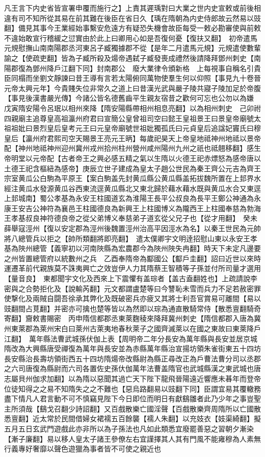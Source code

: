 凡王言下内史省皆宣署申覆而施行之】上責其遲瑀對曰大業之世内史宣敕或前後相違有司不知所從其易在前其難在後臣在省日久【瑀在隋朝為内史侍郎故云然易以豉翻】備見其事今王業經始事繫安危遠方有疑恐失機會故臣每受一敕必勘審使與前敕不違始敢宣行稽緩之愆實由於此上曰卿用心如是吾復何憂【復扶又翻】　初帝遣馬元規慰撫山南南陽郡丞河東呂子臧獨據郡不從【是年二月遣馬元規】元規遣使數輩諭之【使疏吏翻】皆為子臧所殺及煬帝遇弑子臧發喪成禮然後請降拜鄧州刺史【南陽郡復為鄧州降戶江翻下同】封南郡公　廢大業律令頒新格　上每視事自稱名引貴臣同榻而坐劉文靜諫曰昔王導有言若太陽俯同萬物使羣生何以仰照【事見九十卷晉元帝太興元年】今貴賤失位非常久之道上曰昔漢光武與嚴子陵共寢子陵加足於帝腹【事見後漢書嚴光傳】今諸公皆名德舊齒平生親友宿昔之歡何可忘也公勿以為嫌　戊寅隋安陽令呂珉以相州來降【隋安陽縣帶相州相息亮翻】以為相州刺史　己卯祔四親廟主追尊皇高祖瀛州府君曰宣簡公皇曾祖司空曰懿王皇祖景王曰景皇帝廟號太祖祖妣曰景烈皇后皇考元王曰元皇帝廟號世祖妣獨孤氏曰元貞皇后追諡妃竇氏曰穆皇后【瀛州府君熙司空天賜景王亮元王昞】每歲祀昊天上帝皇地祗神州地祗以景帝配【神州地祗神州迎州冀州戎州拾州柱州營州咸州陽州九州之祇也祗翹移翻】感生帝明堂以元帝配【古者帝王之興必感五精之氣以生隋以火德王祀赤熛怒為感帝唐以土德王祀含樞紐為感帝】庚辰立世子建成為皇太子趙公世民為秦王齊公元吉為齊王宗室黄瓜公白駒為平原王【案白駒盖先封黄瓜縣公黄瓜縣盖拓拔魏所置在上邽界水經注黄瓜水發源黄瓜谷西東流逕黄瓜縣北又東北歸於藉水藉水既與黄瓜水合又東逕上邽城南】蜀公孝基為永安王柱國道玄為淮陽王長平公叔良為長平王鄭公神通為永康王安吉公神符為襄邑王柱國德良為新興王上柱國博义為隴西王上柱國奉慈為勃海王孝基叔良神符德良帝之從父弟博义奉慈弟子道玄從父兄子也【從才用翻】　癸未薛舉寇涇州【復以安定郡為涇州後魏置涇州治高平因涇水為名】以秦王世民為元帥將八總管兵以拒之【帥所類翻將即亮翻】　遣太僕卿宇文明逹招慰山東以永安王孝基為陜州總管【義寧初以河南陜縣為宏農郡今為陜州陜失冉翻】時天下未定凡邊要之州皆置總管府以統數州之兵　乙酉奉隋帝為酅國公【酅戶圭翻】詔曰近世以來時運遷革前代親族莫不誅夷興亡之效豈伊人力其隋蔡王智積等子孫並付所司量才選用【量音良】　東都聞宇文化及西來上下震懼有盖琮者【盖古盍翻姓也】上疏請說李密與之合勢拒化及【說輸芮翻】元文都謂盧楚等曰今讐恥未雪而兵力不足若赦密罪使撃化及兩賊自闘吾徐承其弊化及既破密兵亦疲又其將士利吾官賞易可離間【易以豉翻間占莧翻】并密亦可擒也楚等皆以為然即以琮為通直散騎常侍【散悉亶翻騎奇寄翻】齎敕書賜密　丙申隋信都郡丞東萊麴稜來降拜冀州刺史【隋信都郡入唐為冀州東萊郡為萊州宋白曰萊州古萊夷地春秋萊子之國齊滅萊以在國之東故曰東萊降戶江翻】　萬年縣法曹武城孫伏伽上表【周明帝二年分長安為萬年縣與長安並居京城隋改為大興縣唐受禪復為萬年與長安並為赤縣萬年縣治宣揚坊領朱雀街東五十四坊長安縣治長壽坊領街西五十四坊隋煬帝改縣尉為縣正尋改正為戶曹法曹分司以丞郡之六司唐復為縣尉而六司各置佐史孫㐲伽萬年法曹盖隋官也武城縣漢之東武城也唐志屬貝州伽求加翻】以為隋以惡聞其過亡天下陛下龍飛晉陽遠近響應未㫷年而登帝位徒知得之之易不知隋失之之不難也【惡烏路翻易以豉翻下同】臣謂宜易其覆轍務盡下情凡人君言動不可不慎竊見陛下今日即位而明日有獻鷂雛者此乃少年之事豈聖主所須哉【鷂戈召翻少詩詔翻】又百戲散樂亡國淫聲【百戲散樂齊周隋所以亡國散悉亶翻】近太常於民間借婦女裙襦五百餘襲【襦人朱翻】以充妓衣【妓渠綺翻】擬五月五日玄武門遊戲此亦非所以為子孫法也凡如此類悉宜廢罷善惡之習朝夕漸染【漸子廉翻】易以移人皇太子諸王參僚左右宜謹擇其人其有門風不能雍穆為人素無行義專好奢靡以聲色遊獵為事者皆不可使之親近也